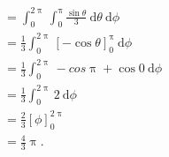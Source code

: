 \documentclass{fmbvecto}
\begin{document}
\begin{problema}
\begin{align*}
        &= \int_0^{2\uppi} \int_0^{\uppi} \frac{\sin \theta}{3} \: \mathrm{d}\theta \: \mathrm{d}\phi \\
        &= \frac{1}{3} \int_0^{2\uppi} \left[ -\cos \theta \right]_0^{\uppi} \: \mathrm{d}\phi \\
        &= \frac{1}{3} \int_0^{2\uppi} -cos \uppi + \cos 0 \: \mathrm{d}\phi \\
        &= \frac{1}{3} \int_0^{2\uppi} 2 \: \mathrm{d}\phi \\
        &= \frac{2}{3} \left[ \phi \right]_0^{2\uppi} \\
        &= \frac{4}{3}\uppi.
    \end{align*}
\end{problema}
\end{document}
